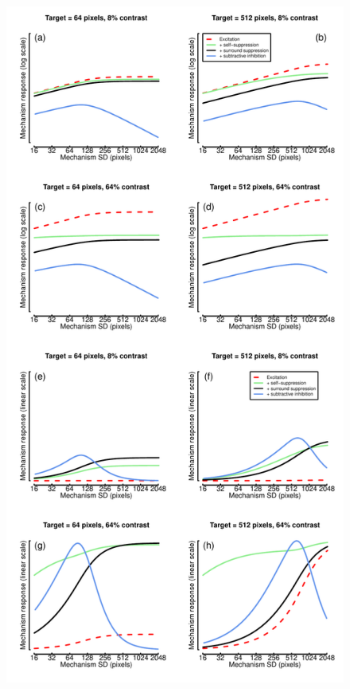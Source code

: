 \documentclass[
]{article}
\begin{document}
\begin{figure}

{\centering \includegraphics[width=0.5\linewidth]{Figures/FigureS3} 

}


\end{figure}
\end{document}
